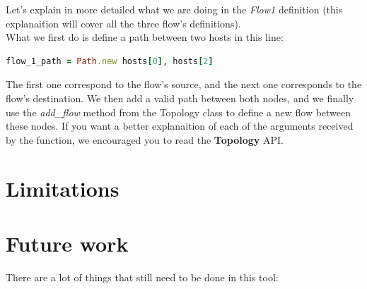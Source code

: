 Let's explain in more detailed what we are doing in the \textit{Flow1} definition (this explanaition will cover all the three flow's definitions).\\
What we first do is define a path between two hosts in this line: 

\begin{lstlisting}[language=Ruby,breaklines=true]
flow_1_path = Path.new hosts[0], hosts[2] 
\end{lstlisting}

The first one correspond to the flow's source, and the next one corresponds to the flow's destination. We then add a valid path between both nodes, and we finally use the \textit{add\_flow} method from the Topology class to define a new flow between these nodes. If you want a better explanaition of each of the arguments received by the function, we encouraged you to read the \textbf{Topology} API.

\section{Limitations}

\section{Future work}

There are a lot of things that still need to be done in this tool:

